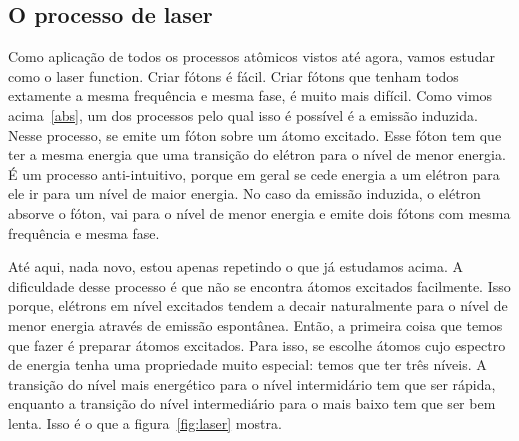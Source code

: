 \documentclass{article}
\begin{document}
\subsection{O processo de laser}

Como aplica\c c\~ao de todos os processos at\^omicos vistos at\'e agora, vamos estudar como o laser function. Criar f\'otons \'e f\'acil. Criar f\'otons que tenham todos extamente a mesma frequ\^encia e mesma fase, \'e muito mais dif\'icil. Como vimos acima~\ref{abs}, um dos processos pelo qual isso \'e poss\'ivel \'e a emiss\~ao induzida. Nesse processo, se emite um f\'oton sobre um \'atomo excitado. Esse f\'oton tem que ter a mesma energia que uma transi\c c\~ao do el\'etron para o n\'ivel de menor energia. \'E um processo anti-intuitivo, porque em geral se cede energia a um el\'etron para ele ir para um n\'ivel de maior energia. No caso da emiss\~ao induzida, o el\'etron absorve o f\'oton, vai para o n\'ivel de menor energia e emite dois f\'otons com mesma frequ\^encia e mesma fase.

At\'e aqui, nada novo, estou apenas repetindo o que j\'a estudamos acima. A dificuldade desse processo \'e que n\~ao se encontra \'atomos excitados facilmente. Isso porque, el\'etrons em n\'ivel excitados tendem a decair naturalmente para o n\'ivel de menor energia atrav\'es de emiss\~ao espont\^anea. Ent\~ao, a primeira coisa que temos que fazer \'e preparar \'atomos excitados. Para isso, se escolhe \'atomos cujo espectro de energia tenha uma propriedade muito especial: temos que ter tr\^es n\'iveis. A transi\c c\~ao do n\'ivel mais energ\'etico para o n\'ivel intermidário tem que ser r\'apida, enquanto a transi\c c\~ao do n\'ivel intermedi\'ario para o mais baixo tem que ser bem lenta. Isso \'e o que a figura~\ref{fig:laser} mostra.
\end{document}
